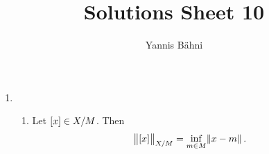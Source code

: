 

\title{Solutions Sheet 10}
\author{Yannis B\"{a}hni}
\address[Yannis B\"{a}hni]{University of Zurich, R\"{a}mistrasse 71, 8006 Zurich}



\maketitle
\thispagestyle{fancy}

\setcounter{section}{1}

\begin{enumerate}[label = \textbf{Exercise \arabic*.},wide = 0pt, itemsep = 1.5ex]
	\item
		~
		\begin{enumerate}[label = \textbf{\alph*.},wide = 0pt, itemsep = 1.5ex]
			\item
				\begin{lemma}
					Let $\sbr{x} \in X/M$. Then
					\begin{equation*}
						\norm{\sbr{x}}_{X/M} = \inf_{m \in M} \norm{x - m}.
					\end{equation*}
				\end{lemma}


\end{enumerate}
\end{enumerate}
